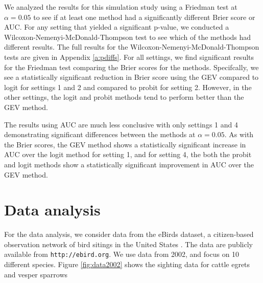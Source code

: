 We analyzed the results for this simulation study using a Friedman test at $\alpha = 0.05$ to see if at least one method had a significantly different Brier score or AUC.
For any setting that yielded a significant p-value, we conducted a Wilcoxon-Nemenyi-McDonald-Thompson test to see which of the methods had different results.
The full results for the Wilcoxon-Nemenyi-McDonald-Thompson tests are given in Appendix \ref{a:pdiffs}.
For all settings, we find significant results for the Friedman test comparing the Brier scores for the methods.
Specifcally, we see a statistically significant reduction in Brier score using the GEV compared to logit for settings 1 and 2 and compared to probit for setting 2.
However, in the other settings, the logit and probit methods tend to perform better than the GEV method.

The results using AUC are much less conclusive with only settings 1 and 4 demonstrating significant differences between the methods at $\alpha = 0.05$.
As with the Brier scores, the GEV method shows a statistically significant increase in AUC over the logit method for setting 1, and for setting 4, the both the probit and logit methods show a statistically significant improvement in AUC over the GEV method.




\section{Data analysis}\label{s:analysis}
For the data analysis, we consider data from the eBirds dataset, a citizen-based observation network of bird sitings in the United States \citep{Sullivan2009}.
The data are publicly available from {\tt http://ebird.org}.
We use data from 2002, and focus on 10 different species.
Figure \ref{fig:data2002} shows the sighting data for cattle egrets and vesper sparrows

